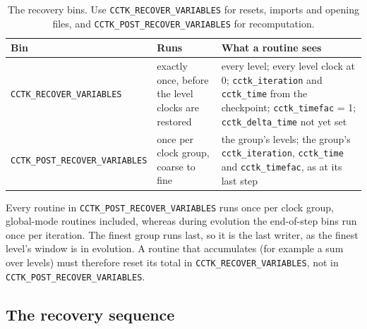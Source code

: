 \begin{table}[ht]
  \centering
  \begin{tabularx}{\textwidth}{lXX}
  Bin & Runs & What a routine sees \\ \hline\hline
  \texttt{CCTK\_RECOVER\_VARIABLES} & exactly once, before the level clocks are restored & every level; every level clock at 0; \texttt{cctk\_iteration} and \texttt{cctk\_time} from the checkpoint; \texttt{cctk\_timefac} = 1; \texttt{cctk\_delta\_time} not yet set \\ \hline
  \texttt{CCTK\_POST\_RECOVER\_VARIABLES} & once per clock group, coarse to fine & the group's levels; the group's \texttt{cctk\_iteration}, \texttt{cctk\_time} and \texttt{cctk\_timefac}, as at its last step \\ \hline\hline
  \end{tabularx}
  \caption{The recovery bins. Use \texttt{CCTK\_RECOVER\_VARIABLES} for resets, imports and opening files, and \texttt{CCTK\_POST\_RECOVER\_VARIABLES} for recomputation.}
  \label{tab:recovery_bins}
\end{table}

Every routine in \texttt{CCTK\_POST\_RECOVER\_VARIABLES} runs once per clock group, global-mode routines included, whereas during evolution the end-of-step bins run once per iteration. The finest group runs last, so it is the last writer, as the finest level's window is in evolution. A routine that accumulates (for example a sum over levels) must therefore reset its total in \texttt{CCTK\_RECOVER\_VARIABLES}, not in \texttt{CCTK\_POST\_RECOVER\_VARIABLES}.

\subsection{The recovery sequence}

